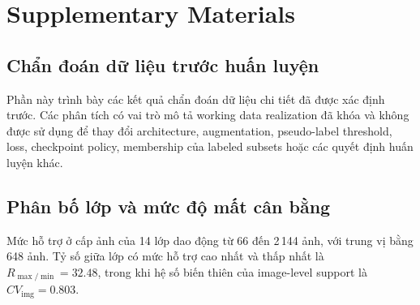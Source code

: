\documentclass[pdflatex,sn-mathphys-num]{sn-jnl}%
\theoremstyle{thmstyleone}%
\theoremstyle{thmstyletwo}%
\theoremstyle{thmstylethree}%
\begin{document}
\section{Supplementary Materials}

\subsection{Chẩn đoán dữ liệu trước huấn luyện}
\label{sec:supp_pretraining_diagnostics}

Phần này trình bày các kết quả chẩn đoán dữ liệu chi tiết đã được xác định trước. Các phân tích có vai trò mô tả working data realization đã khóa và không được sử dụng để thay đổi architecture, augmentation, pseudo-label threshold, loss, checkpoint policy, membership của labeled subsets hoặc các quyết định huấn luyện khác.

\subsection{Phân bố lớp và mức độ mất cân bằng}

Mức hỗ trợ ở cấp ảnh của 14 lớp dao động từ 66 đến 2\,144 ảnh, với trung vị bằng 648 ảnh. Tỷ số giữa lớp có mức hỗ trợ cao nhất và thấp nhất là \(R_{\max/\min}=32.48\), trong khi hệ số biến thiên của image-level support là \(CV_{\mathrm{img}}=0.803\).
\end{document}
